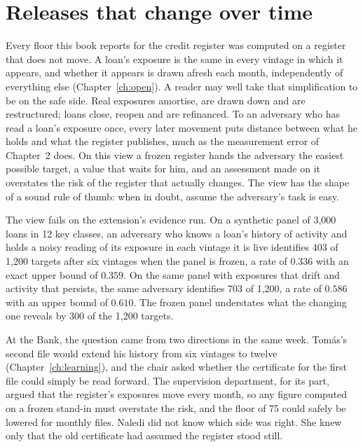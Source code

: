 \chapter{Releases that change over time}\label{ch:change}

Every floor this book reports for the credit register was computed on a register that does
not move. A loan's exposure is the same in every vintage in which it appears, and whether
it appears is drawn afresh each month, independently of everything else (Chapter~\ref{ch:open}). A
reader may well take that simplification to be on the safe side. Real exposures amortise, are
drawn down and are restructured; loans close, reopen and are refinanced. To an adversary
who has read a loan's exposure once, every later movement puts distance between what he
holds and what the register publishes, much as the measurement error of Chapter~2 does.
On this view a frozen register hands the adversary the easiest possible target, a value that
waits for him, and an assessment made on it overstates the risk of the register that actually
changes. The view has the shape of a sound rule of thumb: when in doubt, assume the
adversary's task is easy.

The view fails on the extension's evidence run. On a synthetic panel of 3,000 loans in 12
key classes, an adversary who knows a loan's history of activity and holds a noisy reading of
its exposure in each vintage it is live identifies 403 of 1,200 targets after six vintages when the
panel is frozen, a rate of $0.336$ with an exact upper bound of $0.359$. On the same panel with
exposures that drift and activity that persists, the same adversary identifies 703 of 1,200, a
rate of $0.586$ with an upper bound of $0.610$. The frozen panel understates what the changing
one reveals by 300 of the 1,200 targets.

At the Bank, the question came from two directions in the same week. Tom\'as's second
file would extend his history from six vintages to twelve (Chapter~\ref{ch:learning}), and the chair asked whether the certificate for the first file could simply be read forward. The supervision department, for its part, argued that the register's exposures move every month, so any figure
computed on a frozen stand-in must overstate the risk, and the floor of 75 could safely be
lowered for monthly files. Naledi did not know which side was right. She knew only that
the old certificate had assumed the register stood still.

\syntheticnote


